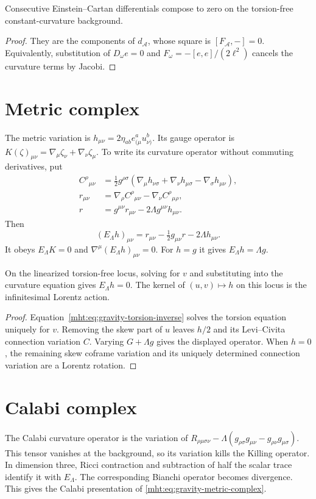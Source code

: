 \begin{proposition}
Consecutive Einstein--Cartan differentials compose to zero
on the torsion-free constant-curvature background.
\end{proposition}
\begin{proof}
They are the components of $d_{\mathcal A}$, whose square is
$[F_{\mathcal A},-]=0$.
Equivalently, substitution of
$D_\omega e=0$ and $F_\omega=-[e,e]/(2\ell^2)$ cancels the
curvature terms by Jacobi.
\end{proof}

\section{Metric complex}
The metric variation is
$h_{\mu\nu}=2\eta_{ab}e^a_{(\mu}u^b_{\nu)}$.
Its gauge operator is
$K(\zeta)_{\mu\nu}=\nabla_\mu\zeta_\nu+\nabla_\nu\zeta_\mu$.
To write its curvature operator without commuting derivatives,
put
\[
 \begin{aligned}
 C^\rho{}_{\mu\nu}
 &=\tfrac12g^{\rho\sigma}
   (\nabla_\mu h_{\nu\sigma}+\nabla_\nu h_{\mu\sigma}
      -\nabla_\sigma h_{\mu\nu}),\\
 r_{\mu\nu}&=\nabla_\rho C^\rho{}_{\mu\nu}
                   -\nabla_\nu C^\rho{}_{\mu\rho},\\
 r&=g^{\mu\nu}r_{\mu\nu}-2\Lambda g^{\mu\nu}h_{\mu\nu}.
 \end{aligned}
\]
Then
\[
 (E_\Lambda h)_{\mu\nu}
 =r_{\mu\nu}-\tfrac12g_{\mu\nu}r-2\Lambda h_{\mu\nu}.
\]
It obeys $E_\Lambda K=0$ and
$\nabla^\mu(E_\Lambda h)_{\mu\nu}=0$.
For $h=g$ it gives $E_\Lambda h=\Lambda g$.

\begin{theorem}
On the linearized torsion-free locus, solving for $v$ and
substituting into the curvature equation gives $E_\Lambda h=0$.
The kernel of $(u,v)\mapsto h$ on this locus is the infinitesimal
Lorentz action.
\end{theorem}
\begin{proof}
Equation~\eqref{mht:eq:gravity-torsion-inverse} solves the
torsion equation uniquely for $v$.
Removing the skew part of $u$ leaves $h/2$ and its
Levi--Civita connection variation $C$.
Varying $G+\Lambda g$ gives the displayed operator.
When $h=0$, the remaining skew coframe variation and its
uniquely determined connection variation are a Lorentz rotation.
\end{proof}

\section{Calabi complex}
The Calabi curvature operator is the variation of
$R_{\rho\mu\sigma\nu}
-\Lambda(g_{\rho\sigma}g_{\mu\nu}-g_{\rho\nu}g_{\mu\sigma})$.
This tensor vanishes at the background, so its variation
kills the Killing operator.
In dimension three, Ricci contraction and subtraction of half
the scalar trace identify it with $E_\Lambda$.
The corresponding Bianchi operator becomes divergence.
This gives the Calabi presentation of
\eqref{mht:eq:gravity-metric-complex}.

